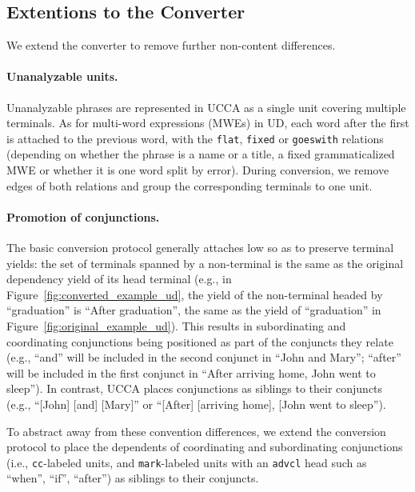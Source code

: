 \documentclass[11pt,a4paper]{article}
\begin{document}
\subsection{Extentions to the Converter}\label{sec:local}

We extend the converter to remove further non-content differences.

\paragraph{Unanalyzable units.}
Unanalyzable phrases are represented in UCCA as a single unit covering multiple terminals.
As for multi-word expressions (MWEs) in UD, each word after the first is attached to the previous word,
with the \texttt{flat}, \texttt{fixed} or \texttt{goeswith} relations
(depending on whether the phrase is a name or a title, a fixed grammaticalized MWE
or whether it is one word split by error).
During conversion, we remove edges of both relations and group the corresponding terminals to one unit.

\paragraph{Promotion of conjunctions.}
The basic conversion protocol generally attaches low so as to preserve terminal yields:
the set of terminals spanned by a non-terminal is the same
as the original dependency yield of its head terminal
(e.g., in Figure~\ref{fig:converted_example_ud}, the yield of the non-terminal
headed by ``graduation'' is ``After graduation'', the same as the yield of ``graduation''
in Figure~\ref{fig:original_example_ud}).
This results in subordinating and coordinating conjunctions being positioned as part
of the conjuncts they relate (e.g., ``and'' will be included in the second conjunct in ``John and Mary''; 
``after'' will be included in the first conjunct in ``After arriving home, John went to sleep'').
In contrast, UCCA places conjunctions as siblings to their conjuncts (e.g., ``[John] [and] [Mary]'' or
``[After] [arriving home], [John went to sleep''). 

To abstract away from these convention differences,
we extend the conversion protocol to place 
the dependents of coordinating and subordinating conjunctions 
(i.e., \texttt{cc}-labeled units, and \texttt{mark}-labeled units with an \texttt{advcl} head such 
as ``when'', ``if'', ``after'') as siblings to their conjuncts.
\end{document}
